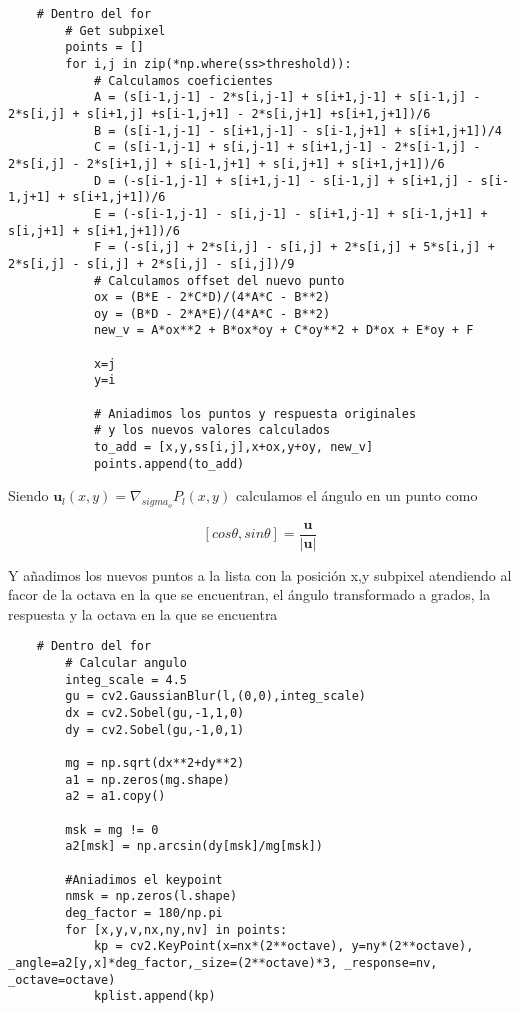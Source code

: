 \documentclass{article}
\begin{document}
\begin{lstlisting}
    # Dentro del for
        # Get subpixel
        points = []
        for i,j in zip(*np.where(ss>threshold)):
            # Calculamos coeficientes
            A = (s[i-1,j-1] - 2*s[i,j-1] + s[i+1,j-1] + s[i-1,j] - 2*s[i,j] + s[i+1,j] +s[i-1,j+1] - 2*s[i,j+1] +s[i+1,j+1])/6
            B = (s[i-1,j-1] - s[i+1,j-1] - s[i-1,j+1] + s[i+1,j+1])/4
            C = (s[i-1,j-1] + s[i,j-1] + s[i+1,j-1] - 2*s[i-1,j] - 2*s[i,j] - 2*s[i+1,j] + s[i-1,j+1] + s[i,j+1] + s[i+1,j+1])/6
            D = (-s[i-1,j-1] + s[i+1,j-1] - s[i-1,j] + s[i+1,j] - s[i-1,j+1] + s[i+1,j+1])/6
            E = (-s[i-1,j-1] - s[i,j-1] - s[i+1,j-1] + s[i-1,j+1] + s[i,j+1] + s[i+1,j+1])/6
            F = (-s[i,j] + 2*s[i,j] - s[i,j] + 2*s[i,j] + 5*s[i,j] + 2*s[i,j] - s[i,j] + 2*s[i,j] - s[i,j])/9
            # Calculamos offset del nuevo punto
            ox = (B*E - 2*C*D)/(4*A*C - B**2)
            oy = (B*D - 2*A*E)/(4*A*C - B**2)
            new_v = A*ox**2 + B*ox*oy + C*oy**2 + D*ox + E*oy + F
        
            x=j
            y=i
            
            # Aniadimos los puntos y respuesta originales
            # y los nuevos valores calculados
            to_add = [x,y,ss[i,j],x+ox,y+oy, new_v]
            points.append(to_add)
\end{lstlisting}

Siendo $\mathbf{u}_l(x,y) = \nabla_{sigma_o} P_l(x,y) $ calculamos el ángulo en un punto como 

\[ [cos \theta, sin \theta ] = \frac{\mathbf{u}}{|\mathbf{u}|}\]

Y añadimos los nuevos puntos a la lista con la posición x,y subpixel atendiendo al facor de la octava en la que se encuentran, el ángulo transformado a grados, la respuesta y la octava en la que se encuentra
\begin{lstlisting}
    # Dentro del for
        # Calcular angulo
        integ_scale = 4.5
        gu = cv2.GaussianBlur(l,(0,0),integ_scale)
        dx = cv2.Sobel(gu,-1,1,0)
        dy = cv2.Sobel(gu,-1,0,1)

        mg = np.sqrt(dx**2+dy**2)
        a1 = np.zeros(mg.shape)
        a2 = a1.copy()

        msk = mg != 0
        a2[msk] = np.arcsin(dy[msk]/mg[msk])
        
        #Aniadimos el keypoint
        nmsk = np.zeros(l.shape)
        deg_factor = 180/np.pi
        for [x,y,v,nx,ny,nv] in points:
            kp = cv2.KeyPoint(x=nx*(2**octave), y=ny*(2**octave), _angle=a2[y,x]*deg_factor,_size=(2**octave)*3, _response=nv, _octave=octave)
            kplist.append(kp)

\end{lstlisting}
\end{document}
